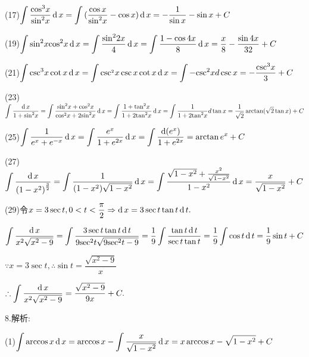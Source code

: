 (17)$\displaystyle\int {\dfrac{{{{\cos }^3}x}}{{{{\sin }^2}x}}} \operatorname{\mathop{}\!\mathrm{d}} x = \displaystyle\int {(\dfrac{{\cos x}}{{{{\sin }^2}x}} - \cos x)\operatorname{\mathop{}\!\mathrm{d}}x =  - \dfrac{1}{{\sin x}} - \sin x + C} $

(19)$\displaystyle\int {{{\sin }^2}x} {\cos ^2}x\operatorname{\mathop{}\!\mathrm{d}} x = \displaystyle\int {\dfrac{{{{\sin }^2}2x}}{4}} \operatorname{\mathop{}\!\mathrm{d}} x = \displaystyle\int {\dfrac{{1 - \cos 4x}}{8}} \operatorname{\mathop{}\!\mathrm{d}} x = \dfrac{x}{8} - \dfrac{{\sin 4x}}{{32}} + C$

(21)$\displaystyle\int {{{\csc }^3}x} \cot x\operatorname{\mathop{}\!\mathrm{d}} x = \displaystyle\int {{{\csc }^{_2}}x} \csc x\cot x\operatorname{\mathop{}\!\mathrm{d}} x = \displaystyle\int { - {{\csc }^2}x} d\csc x =  - \frac{{{{\csc }^3}x}}{3} + C$

(23)$\displaystyle\int {\dfrac{{\operatorname{\mathop{}\!\mathrm{d}}x}}{{1 + {{\sin }^2}x}}} = \displaystyle\int {\dfrac{{{{\sin }^2}x + {{\cos }^2}x}}{{{{\cos }^2}x + 2{{\sin }^2}x}}} \operatorname{\mathop{}\!\mathrm{d}} x = \displaystyle\int {\dfrac{{1 + {{\tan }^2}x}}{{1 + 2{{\tan }^2}x}}} \operatorname{\mathop{}\!\mathrm{d}} x = \displaystyle\int {\dfrac{1}{{1 + 2{{\tan }^2}x}}} d\tan x = \dfrac{1}{{\sqrt 2 }}\arctan (\sqrt 2 \tan x) + C$

(25)$\displaystyle\int {\dfrac{1}{{{e^x} + {e^{ - x}}}}} \operatorname{\mathop{}\!\mathrm{d}} x = \displaystyle\int {\dfrac{{{e^x}}}{{1 + {e^{2x}}}}} \operatorname{\mathop{}\!\mathrm{d}} x = \displaystyle\int {\dfrac{{\operatorname{\mathop{}\!\mathrm{d}}({e^x})}}{{1 + {e^{2x}}}}}  = \arctan {e^x} + C$

(27)$\displaystyle\int {\dfrac{{\operatorname{\mathop{}\!\mathrm{d}}x}}{{{{(1 - {x^2})}^{\frac{3}{2}}}}}}  = \displaystyle\int {\dfrac{1}{{(1 - {x^2})\sqrt {1 - {x^2}} }}} \operatorname{\mathop{}\!\mathrm{d}} x = \displaystyle\int {\dfrac{{\sqrt {1 - {x^2}}  + \frac{{{x^2}}}{{\sqrt {1 - {x^2}} }}}}{{1 - {x^2}}}} \operatorname{\mathop{}\!\mathrm{d}} x = \dfrac{x}{{\sqrt {1 - {x^2}} }} + C$

(29)令$x = 3\sec t,0 < t < \dfrac{\pi }{2} \Rightarrow \operatorname{\mathop{}\!\mathrm{d}} x = 3\sec t\tan t\operatorname{\mathop{}\!\mathrm{d}} t.$

$\displaystyle\int {\dfrac{{\operatorname{\mathop{}\!\mathrm{d}}x}}{{{x^2}\sqrt {{x^2} - 9} }}}  = \displaystyle\int {\dfrac{{3\sec t\tan t\operatorname{\mathop{}\!\mathrm{d}}t}}{{9{{\sec }^2}t\sqrt {9{{\sec }^2}t - 9} }}}  = \dfrac{1}{9}\displaystyle\int {\dfrac{{\tan t\operatorname{\mathop{}\!\mathrm{d}}t}}{{\sec t\tan t}}}  = \dfrac{1}{9}\displaystyle\int {\cos t\operatorname{\mathop{}\!\mathrm{d}}t}  = \dfrac{1}{9}\sin t + C$

$\because x = 3\sec t,\therefore \sin t = \dfrac{{\sqrt {{x^2} - 9} }}{x}$

$\therefore \displaystyle\int {\dfrac{{\operatorname{\mathop{}\!\mathrm{d}}x}}{{{x^2}\sqrt {{x^2} - 9} }}}  = \dfrac{{\sqrt {{x^2} - 9} }}{{9x}} + C.$

8.解析:

(1)$\displaystyle\int {\arccos x\operatorname{\mathop{}\!\mathrm{d}}x = \arccos x - \displaystyle\int {\dfrac{x}{{\sqrt {1 - {x^2}} }}} } \operatorname{\mathop{}\!\mathrm{d}} x = x\arccos x - \sqrt {1 - {x^2}}  + C$


